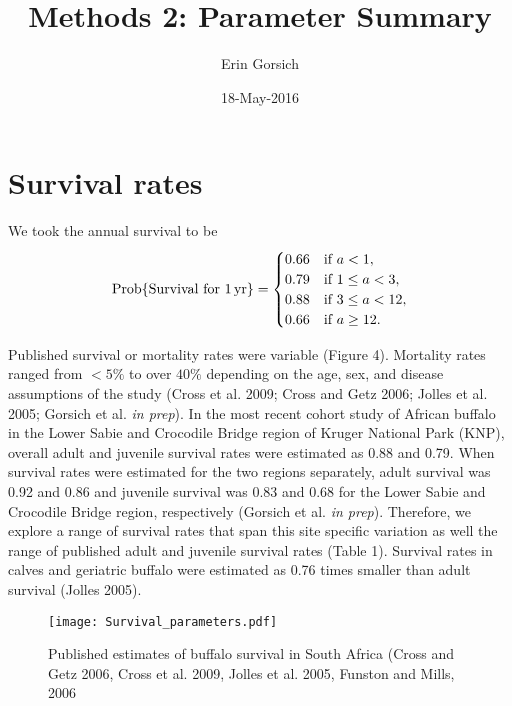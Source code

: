 \documentclass[letterpaper,12pt]{article}
\DeclareMathOperator{\Prob}{Prob}
\begin{document}

\renewcommand{\thesubfigure}{\Alph{subfigure}}

\title{Methods 2: Parameter Summary}
\author{Erin Gorsich}
\date{18-May-2016}

\maketitle
\doublespacing

\section{Survival rates}
We took the annual survival to be
\begin{equation}
  \Prob\{\text{Survival for $\unit[1]{yr}$}\}
  =
  \begin{cases}
    0.66 & \text{if $a < 1$},
    \\
    0.79 & \text{if $1 \leq a < 3$},
    \\
   0.88 & \text{if $3 \leq a < 12$},
    \\
    0.66 & \text{if $a \geq 12$}.
  \end{cases}
\end{equation}

Published survival or mortality rates were variable (Figure 4).  
Mortality rates ranged from $<5\%$ to over $40\%$ depending on the age, sex, and disease assumptions of the study (Cross et al. 2009; Cross and Getz 2006; Jolles et al. 2005; Gorsich et al. \textit{in prep}).  
In the most recent cohort study of African buffalo in the Lower Sabie and Crocodile Bridge region of Kruger National Park (KNP), overall adult and juvenile survival rates were estimated as 0.88 and 0.79.  
When survival rates were estimated for the two regions separately, adult survival was 0.92 and 0.86 and juvenile survival was 0.83 and 0.68 for the Lower Sabie and Crocodile Bridge region, respectively (Gorsich et al. \textit{in prep}).  
Therefore, we explore a range of survival rates that span this site specific variation as well the range of published adult and juvenile survival rates (Table 1).  
Survival rates in calves and geriatric buffalo were estimated as 0.76 times smaller than adult survival (Jolles 2005).

\begin{figure}[h]
\begin{center}
\texttt{[image: Survival\_parameters.pdf]}
\caption{Published estimates of buffalo survival in South Africa (Cross and Getz 2006, Cross et al. 2009, Jolles et al. 2005, Funston and Mills, 2006}
\end{center}
\end{figure}
\end{document}
